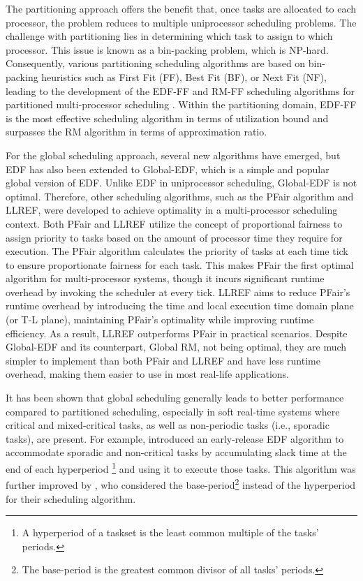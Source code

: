 The partitioning approach offers the benefit that, once tasks 
are allocated to each processor, the problem reduces to multiple 
uniprocessor scheduling problems. The challenge with partitioning 
lies in determining which task to assign to which processor. 
This issue is known as a bin-packing problem, which is 
NP-hard\cite{bin_packing_pb}. Consequently, various partitioning 
scheduling algorithms are based on bin-packing heuristics such 
as First Fit (FF), Best Fit (BF), or Next Fit (NF), leading to 
the development of the EDF-FF and RM-FF scheduling algorithms 
for partitioned multi-processor scheduling\cite{oh1993tightRMFFBound}
\cite{lopez2000wcUEDF}. Within the partitioning domain, 
EDF-FF is the most effective scheduling algorithm in terms of 
utilization bound and surpasses the RM algorithm in terms of 
approximation ratio\cite{lopez2000wcUEDF}.

For the global scheduling approach, several new algorithms have 
emerged, but EDF has also been extended to Global-EDF, which is a 
simple and popular global version of EDF\cite{li2015globalEDF}. 
Unlike EDF in uniprocessor scheduling, Global-EDF is not optimal. 
Therefore, other scheduling algorithms, such as the PFair\cite{baruah1993PFair} 
algorithm and LLREF\cite{cho2006LLREF}, were developed to achieve 
optimality in a multi-processor scheduling context. Both PFair and 
LLREF utilize the concept of proportional fairness to assign 
priority to tasks based on the amount of processor time they 
require for execution. The PFair algorithm calculates the priority 
of tasks at each time tick to ensure proportionate fairness for each 
task. This makes PFair the first optimal algorithm for multi-processor 
systems, though it incurs significant runtime overhead by invoking 
the scheduler at every tick. LLREF aims to reduce PFair's runtime 
overhead by introducing the time and local execution time domain 
plane (or T-L plane), maintaining PFair's optimality while improving 
runtime efficiency. As a result, LLREF outperforms PFair in 
practical scenarios. Despite Global-EDF and its counterpart, 
Global RM, not being optimal, they are much simpler to implement 
than both PFair and LLREF and have less runtime overhead, making 
them easier to use in most real-life applications.

It has been shown that global scheduling generally leads to 
better performance compared to partitioned scheduling\cite{srinivasan2003globalbetterthanpart}, 
especially in soft real-time systems where critical and mixed-critical tasks, as well 
as non-periodic tasks (i.e., sporadic tasks), are present. For 
example, \cite{matschulat2007EREDF} introduced an early-release EDF 
algorithm to accommodate sporadic and non-critical tasks by 
accumulating slack time at the end of each hyperperiod
\footnote{A hyperperiod of a taskset is the least common multiple of the tasks' periods.} 
and using it to execute those tasks. This algorithm was further 
improved by \cite{yip2014relaxing}, who considered the 
base-period\footnote{The base-period is the greatest common divisor of all tasks' periods.} 
instead of the hyperperiod for their scheduling algorithm.
\newline

